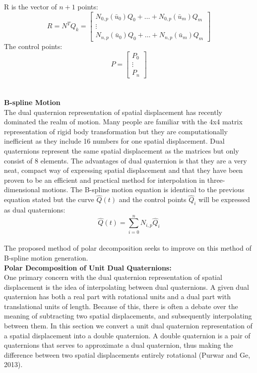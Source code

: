 \documentclass[11pt]{article}
\begin{document}
R is the vector of $n+1$ points:
$$R =N^TQ_k= \left[\begin{array}{c}
    N_{0,p}(\bar{u}_0)Q_0+\ldots+N_{0,p}(\bar{u}_{m})Q_{m} \\
    \vdots \\
    N_{n,p}(\bar{u}_0)Q_0+\ldots+N_{n,p}(\bar{u}_{m})Q_{m}
  \end{array}\right]$$
The control points:
$$ P = \left[\begin{array}{c}
         P_0 \\
         \vdots \\
         P_{n}
       \end{array}\right]$$
\\
\\
\textbf{\large{B-spline Motion}}
\\
The dual quaternion representation of spatial displacement has recently dominated the realm of motion. Many people are familiar with the 4x4 matrix representation of rigid body transformation but they are computationally inefficient as they include 16 numbers for one spatial displacement. Dual quaternions represent the same spatial displacement as the matrices but only consist of 8 elements. The advantages of dual quaternion is that they are a very neat, compact way of expressing spatial displacement and that they have been proven to be an efficient and practical method for interpolation in three-dimensional motions. The B-spline motion equation is identical to the previous equation stated but the curve $\hat{Q}(t)$ and the control points $\hat{Q}_i$ will be expressed as dual quaternions:
$$ \hat{Q}(t) = \sum^n_{i=0} N_{i,p} \hat{Q}_i$$
\\
The proposed method of polar decomposition seeks to improve on this method of B-spline motion generation.
\\
\textbf{Polar Decomposition of Unit Dual Quaternions:}
\\
One primary concern with the dual quaternion representation of spatial displacement is the idea of interpolating between dual quaternions. A given dual quaternion has both a real part with rotational units and a dual part with translational units of length. Because of this, there is often a debate over the meaning of subtracting two spatial displacements, and subsequently interpolating between them. In this section we convert a unit dual quaternion representation of a spatial displacement into a double quaternion. A double quaternion is a pair of quaternions that serves to approximate a dual quaternion, thus making the difference between two spatial displacements entirely rotational (Purwar and Ge, 2013).
\end{document}
